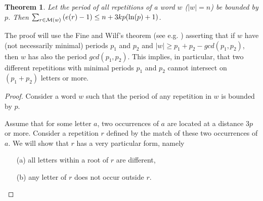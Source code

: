 \documentclass[11pt]{article}
\newtheorem{theorem}{Theorem}
\def\paren#1{\left( #1 \right)}
\newcommand{\mr}[1]{{\cal M}({#1})}
\begin{document}
\begin{theorem}
\label{t4}
Let the period of all repetitions of a word $w$ ($|w|=n$) be bounded
by $p$. Then
$\sum_{r\in \mr{w}}\paren{e(r)-1}\leq n+3kp(\ln(p)+1)$.
\end{theorem}

The proof will use the Fine and Wilf's theorem (see
e.g. \cite{Lothaire83}) asserting that if $w$ have (not necessarily
minimal) periods $p_1$ and $p_2$ and $|w|\geq p_1+p_2-gcd(p_1,p_2)$, 
then $w$ has also the period $gcd(p_1,p_2)$. This implies, in particular, that two
different repetitions with minimal periods $p_1$ and $p_2$ cannot intersect on
$(p_1+p_2)$ letters or more. 

\begin{proof}
Consider a word $w$ such that the period of any repetition in $w$ is
bounded by $p$. 

Assume that for some letter $a$, two occurrences of $a$ are located at
a distance $3p$ or more. 
Consider a repetition $r$ defined by the match of these two
occurrences of $a$. 
We will show that $r$ has a very particular form, namely
\begin{itemize}
\item[(a)] all letters within a root of $r$ are different,
\item[(b)] any letter of $r$ does not occur outside $r$.
\end{itemize}



\end{proof}
\end{document}
